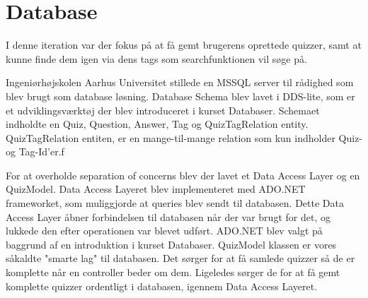 \section{Database}
I denne iteration var der fokus på at få gemt brugerens oprettede quizzer, samt at kunne finde dem igen via dens tags som searchfunktionen vil søge på. 

Ingeniørhøjskolen Aarhus Universitet stillede en MSSQL server til rådighed som blev brugt som database løsning. Database Schema blev lavet i DDS-lite, som er et udviklingsværktøj der blev introduceret i kurset Databaser. Schemaet indholdte en Quiz, Question, Answer, Tag og QuizTagRelation entity. QuizTagRelation entiten, er en mange-til-mange relation som kun indholder Quiz- og Tag-Id'er.f


For at overholde separation of concerns blev der lavet et Data Access Layer og en QuizModel. Data Access Layeret blev implementeret med ADO.NET frameworket, som muliggjorde at queries blev sendt til databasen. Dette Data Access Layer åbner forbindelsen til databasen når der var brugt for det, og lukkede den efter operationen var blevet udført. ADO.NET blev valgt på baggrund af en introduktion i kurset Databaser. QuizModel klassen er vores såkaldte "smarte lag" til databasen. Det sørger for at få samlede quizzer så de er komplette når en controller beder om dem. Ligeledes sørger de for at få gemt komplette quizzer ordentligt i databasen, igennem Data Access Layeret.



